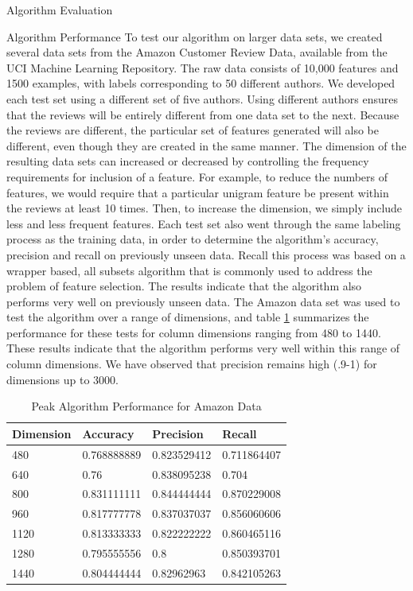 \documentclass{llncs}
\begin{document}
\begin{section}{Algorithm Evaluation}
\begin{subsection}{Algorithm Performance}
To test our algorithm on larger data sets, we created several data sets from the Amazon Customer Review Data, available from the UCI Machine Learning Repository\cite{UCI}. The raw data consists of 10,000 features and 1500 examples, with labels corresponding to 50 different authors. We developed each test set using a different set of five authors. Using different authors ensures that the reviews will be entirely different from one data set to the next. Because the reviews are different, the particular set of features generated will also be different, even though they are created in the same manner. The dimension of the  resulting data sets can increased or decreased by controlling the frequency requirements for inclusion of a feature. For example, to reduce the numbers of features, we would require that a particular unigram feature be present within the reviews at least 10 times. Then, to increase the dimension, we simply include less and less frequent features. Each test set also went through the same labeling process as the training data, in order to determine the algorithm's accuracy, precision and recall on previously unseen data. Recall this process was based on a wrapper based, all subsets algorithm that is commonly used to address the problem of feature selection. The results indicate that the algorithm also performs very well on previously unseen data. The Amazon data set was used to test the algorithm over a range of dimensions, and table \ref{tab:amazonRanges} summarizes the performance for these tests for column dimensions ranging from 480 to 1440. These results indicate that the algorithm performs very well within this range of column dimensions. We have observed that precision remains high (.9-1) for dimensions up to 3000.
\begin{table}[ht]
\centering
\caption{Peak Algorithm Performance for Amazon Data}
\begin{tabular}{l l l l}
\hline \hline
Dimension& Accuracy &Precision&  Recall\\
\hline
480	&0.768888889&	0.823529412&	0.711864407\\
640&	0.76&	0.838095238&	0.704\\
800&	0.831111111&	0.844444444&	0.870229008\\
960&	0.817777778&	0.837037037&	0.856060606\\
1120&	0.813333333&	0.822222222&	0.860465116\\
1280&	0.795555556&	0.8&	0.850393701\\
1440&	0.804444444&	0.82962963&	0.842105263\\
\hline
\end{tabular}
\label{tab:amazonRanges}
\end{table}
\end{subsection}



\end{section}
\end{document}
